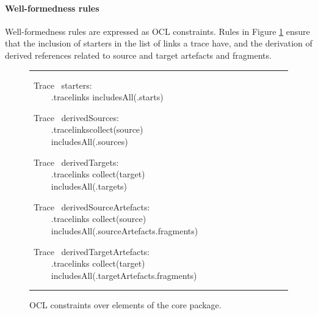 \pagebreak
\paragraph{Well-formedness rules}
Well-formedness rules are expressed as OCL constraints. 
Rules in Figure \ref{fig:ocl-core} ensure that the inclusion of starters in the list of links a trace have, and the derivation of derived references related to source and target artefacts and fragments. 
\begin{figure}[h]
\centering 
\rule{0.9\linewidth}{1pt}
\vspace{-0.2truecm}
\small
\begin{ocl}[0.85\linewidth]

\vspace{0.3truecm}\OCLcontext~Trace \OCLinv ~starters: \\ \verb+     +\OCLself.tracelinks \OCLarrow includesAll(\OCLself.starts)  

\vspace{0.3truecm}\OCLcontext~Trace \OCLinv ~derivedSources: \\ \verb+     +\OCLself.tracelinks\OCLarrow collect(source) 
\\ \verb+     +\OCLarrow includesAll(\OCLself.sources)   

\vspace{0.3truecm}\OCLcontext~Trace \OCLinv ~derivedTargets: \\ \verb+     +\OCLself.tracelinks \OCLarrow collect(target) 
\\ \verb+     +\OCLarrow includesAll(\OCLself.targets)   

\vspace{0.3truecm}\OCLcontext~Trace \OCLinv ~derivedSourceArtefacts: \\ \verb+     +\OCLself.tracelinks \OCLarrow collect(source)  
\\ \verb+     +\OCLarrow includesAll(\OCLself.sourceArtefacts.fragments)   

\vspace{0.3truecm}\OCLcontext~Trace \OCLinv ~derivedTargetArtefacts: \\ \verb+     +\OCLself.tracelinks \OCLarrow collect(target)  
\\ \verb+     +\OCLarrow includesAll(\OCLself.targetArtefacts.fragments)   

\end{ocl}

\vspace{0.4truecm}
\rule{0.9\linewidth}{1pt}
\vspace{-0.2truecm}

\caption{OCL constraints over elements of the core package.}
\label{fig:ocl-core}
\vspace{-0.6truecm}
\end{figure}

